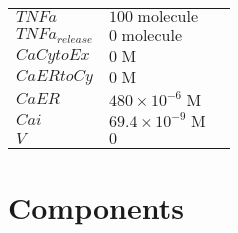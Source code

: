 \documentclass[a4paper,10.0pt]{article}
\begin{document}
{\begin{longtabu}{| l l l |}
  $TNFa$\hspace{0.5cm} & $100\;\mathrm{molecule}$\hspace{0.5cm} & \hspace{0.5cm}\\
  $TNFa_{release}$\hspace{0.5cm} & $0\;\mathrm{molecule}$\hspace{0.5cm} & \hspace{0.5cm}\\
  $CaCytoEx$\hspace{0.5cm} & $0\;\mathrm{M}$\hspace{0.5cm} & \hspace{0.5cm}\\
  $CaERtoCy$\hspace{0.5cm} & $0\;\mathrm{M}$\hspace{0.5cm} & \hspace{0.5cm}\\
  $CaER$\hspace{0.5cm} & $480\!\times\!10 ^{-6}\;\mathrm{M}$\hspace{0.5cm} & \hspace{0.5cm}\\
  $Cai$\hspace{0.5cm} & $69.4\!\times\!10 ^{-9}\;\mathrm{M}$\hspace{0.5cm} & \hspace{0.5cm}\\
  $V$\hspace{0.5cm} & $0$\hspace{0.5cm} & \hspace{0.5cm}\\
\hline
\end{longtabu}




\section*{Components}
\label{sec:ODE_Components}

}
\end{document}
